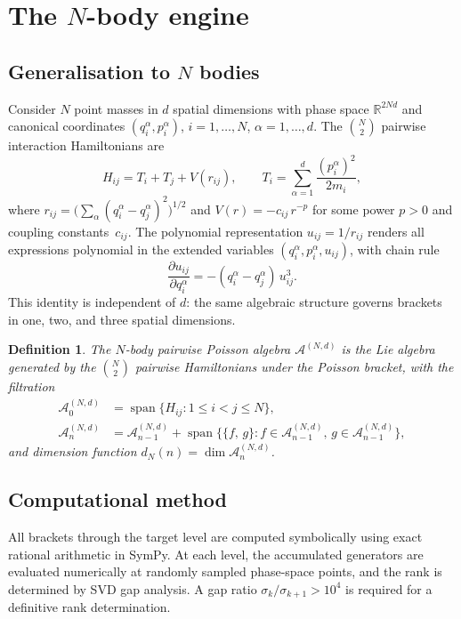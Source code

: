\documentclass[11pt,a4paper]{article}
\newtheorem{definition}[theorem]{Definition}
\theoremstyle{remark}
\newcommand{\pb}[2]{\{#1,\,#2\}}
\newcommand{\R}{\mathbb{R}}
\newcommand{\cA}{\mathcal{A}}
\DeclareMathOperator{\Span}{span}
\begin{document}
\section{The $N$-body engine}
\label{sec:engine}

\subsection{Generalisation to $N$ bodies}

Consider $N$ point masses in $d$ spatial dimensions with
phase space $\R^{2Nd}$ and canonical coordinates
$(q_i^\alpha, p_i^\alpha)$, $i = 1, \ldots, N$,
$\alpha = 1, \ldots, d$.  The $\binom{N}{2}$ pairwise
interaction Hamiltonians are
\[
  H_{ij} = T_i + T_j + V(r_{ij}), \qquad
  T_i = \sum_{\alpha=1}^{d}
    \frac{(p_i^\alpha)^2}{2m_i},
\]
where $r_{ij} = \bigl(\sum_\alpha
(q_i^\alpha - q_j^\alpha)^2\bigr)^{1/2}$ and
$V(r) = -c_{ij}\, r^{-p}$ for some power $p > 0$ and
coupling constants~$c_{ij}$.  The polynomial
representation $u_{ij} = 1/r_{ij}$ renders all
expressions polynomial in the extended variables
$(q_i^\alpha, p_i^\alpha, u_{ij})$, with chain rule
\[
  \frac{\partial u_{ij}}{\partial q_i^\alpha}
  = -(q_i^\alpha - q_j^\alpha)\, u_{ij}^3.
\]
This identity is independent of $d$: the same algebraic
structure governs brackets in one, two, and three spatial
dimensions.

\begin{definition}
The \emph{$N$-body pairwise Poisson algebra}
$\cA^{(N,d)}$ is the Lie algebra generated by the
$\binom{N}{2}$ pairwise Hamiltonians under the Poisson
bracket, with the filtration
\begin{align*}
  \cA_0^{(N,d)} &= \Span\{H_{ij} : 1 \le i < j \le N\},
  \\
  \cA_n^{(N,d)} &= \cA_{n-1}^{(N,d)}
    + \Span\bigl\{\pb{f}{g} :
    f \in \cA_{n-1}^{(N,d)},\,
    g \in \cA_{n-1}^{(N,d)}\bigr\},
\end{align*}
and dimension function $d_N(n) = \dim \cA_n^{(N,d)}$.
\end{definition}

\subsection{Computational method}

All brackets through the target level are computed
symbolically using exact rational arithmetic in SymPy.
At each level, the accumulated generators are evaluated
numerically at randomly sampled phase-space points, and
the rank is determined by SVD gap analysis.  A gap ratio
$\sigma_k / \sigma_{k+1} > 10^4$ is required for a
definitive rank determination.
\end{document}

